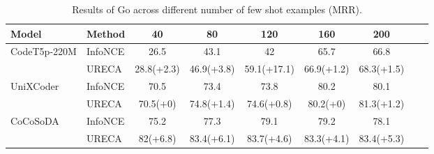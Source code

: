 \begin{table*}[h]
\def\arraystretch{1.0}
\setlength\tabcolsep{8pt} %
\begin{tabular}{@{}lllcccccc@{}}

\toprule
Model                            & \multicolumn{1}{l}{Method}              & \multicolumn{1}{c}{40}           
& \multicolumn{1}{c}{80}         & \multicolumn{1}{c}{120}               & \multicolumn{1}{c}{160}     
& \multicolumn{1}{c}{200}        \\ \midrule

\multirow{2}{*}{CodeT5p-220M}      
& InfoNCE                   & \multicolumn{1}{c}{26.5}                & \multicolumn{1}{c}{43.1}          
                            & \multicolumn{1}{c}{42}                & \multicolumn{1}{c}{65.7}          
                            & \multicolumn{1}{c}{66.8}                  
                            \\ \cmidrule(l){2-7} 
& URECA                     & \multicolumn{1}{c}{28.8(+2.3)}          & \multicolumn{1}{c}{46.9(+3.8)}          
                            & \multicolumn{1}{c}{59.1(+17.1)}          & \multicolumn{1}{c}{66.9(+1.2)}          
                            & \multicolumn{1}{c}{68.3(+1.5)}                   
                            \\ \midrule

\multirow{2}{*}{UniXCoder} 
& InfoNCE                   & \multicolumn{1}{c}{70.5}               & \multicolumn{1}{c}{73.4}          
                            & \multicolumn{1}{c}{73.8}               & \multicolumn{1}{c}{80.2}          
                            & \multicolumn{1}{c}{80.1}                   
                            \\ \cmidrule(l){2-7} 
& URECA                     & \multicolumn{1}{c}{70.5(+0)}          & \multicolumn{1}{c}{74.8(+1.4)}          
                            & \multicolumn{1}{c}{74.6(+0.8)}          & \multicolumn{1}{c}{80.2(+0)}          
                            & \multicolumn{1}{c}{81.3(+1.2)}                  
                            \\ \midrule

\multirow{2}{*}{CoCoSoDA} 
& InfoNCE                   & \multicolumn{1}{c}{75.2}             & \multicolumn{1}{c}{77.3}          
                            & \multicolumn{1}{c}{79.1}             & \multicolumn{1}{c}{79.2}          
                            & \multicolumn{1}{c}{78.1}                    
                            \\ \cmidrule(l){2-7} 
& URECA                     & \multicolumn{1}{c}{82(+6.8)}          & \multicolumn{1}{c}{83.4(+6.1)}          
                            & \multicolumn{1}{c}{83.7(+4.6)}          & \multicolumn{1}{c}{83.3(+4.1)}          
                            & \multicolumn{1}{c}{83.4(+5.3)}                   
                            \\ \bottomrule 
\end{tabular}
\caption{Results of Go across different number of few shot examples (MRR).}
\label{CSN_Go}
\end{table*}

